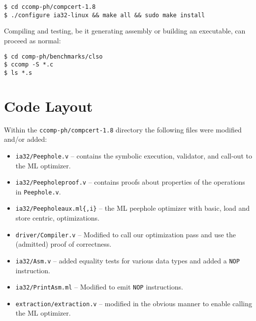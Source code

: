 \documentclass{article}
\begin{document}
\begin{verbatim}
$ cd ccomp-ph/compcert-1.8
$ ./configure ia32-linux && make all && sudo make install
\end{verbatim}

Compiling and testing, be it generating assembly or building an
executable, can proceed as normal:

\begin{verbatim}
$ cd comp-ph/benchmarks/clso
$ ccomp -S *.c
$ ls *.s
\end{verbatim}

\section{Code Layout}
Within the {\tt ccomp-ph/compcert-1.8} directory the following files
were modified and/or added:

\begin{itemize}
\item {\tt ia32/Peephole.v} -- contains the symbolic execution,
  validator, and call-out to the ML optimizer.
\item {\tt ia32/Peepholeproof.v} -- contains proofs about
  properties of the operations in {\tt Peephole.v}.
\item {\tt ia32/Peepholeaux.ml\{,i\}} -- the ML peephole
  optimizer with basic, load and store centric, optimizations.
\item {\tt driver/Compiler.v} -- Modified to call our
  optimization pass and use the (admitted) proof of correctness.
\item {\tt ia32/Asm.v} -- added equality tests for various data
  types and added a {\tt NOP} instruction.
\item {\tt ia32/PrintAsm.ml} -- Modified to emit {\tt NOP} instructions.
\item {\tt extraction/extraction.v} -- modified in the obvious
  manner to enable calling the ML optimizer.
\end{itemize}
\end{document}
